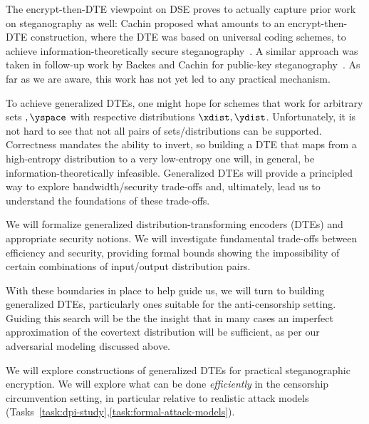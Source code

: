 {The encrypt-then-DTE viewpoint on DSE proves to actually capture prior work on
steganography as well: Cachin proposed what amounts to an encrypt-then-DTE
construction, where the DTE was based on universal coding schemes, to achieve
information-theoretically secure steganography~\cite{Cachin:Info_Theory_Stego}.
A similar approach was taken in follow-up work by Backes and Cachin for
public-key steganography~\cite{BC04}.
As far as we are aware, this work has not yet led to any practical mechanism.

To achieve generalized DTEs, one might hope for schemes that work for 
arbitrary sets $\xspace,\yspace$ with respective
distributions $\xdist,\ydist$.
Unfortunately, it is not hard to see that not all pairs of sets/distributions
can be supported.
Correctness mandates the ability to invert, so building a DTE that maps from
a high-entropy distribution to a very low-entropy one will, in general, be
information-theoretically infeasible. 
Generalized DTEs will provide a principled way to explore 
bandwidth/security trade-offs and, ultimately, lead us to understand the foundations of these
trade-offs. 

\begin{task} 
\label{task:foundations-gen-dte}
We will formalize generalized distribution-transforming encoders
(DTEs) and appropriate security notions. 
We will investigate fundamental trade-offs between efficiency and security,
providing formal bounds showing the impossibility of certain
combinations of input/output distribution pairs. 
\end{task}

\noindent With these boundaries in place to help guide us, 
we will turn to building generalized DTEs, particularly ones  
suitable for the anti-censorship setting.  Guiding this search will be the
the insight that in many cases an imperfect approximation of the covertext
distribution will be sufficient, as per our adversarial modeling discussed
above.

\begin{task}
\label{task:use-gen-dte}  We will explore constructions of generalized
DTEs for practical steganographic encryption.  %
We will explore 
  what can be done \textit{efficiently} in the censorship
  circumvention setting, in particular relative to realistic attack models (Tasks~\ref{task:dpi-study},\ref{task:formal-attack-models}).
\end{task}

}
